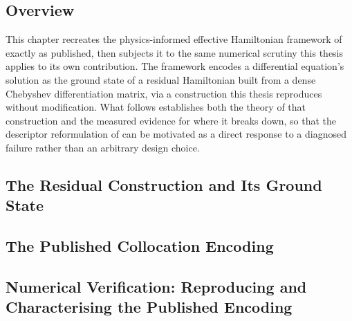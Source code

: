%

\subsection{Overview}
This chapter recreates the physics-informed effective Hamiltonian framework of \cite{wu2025pihm} exactly as published, then subjects it to the same numerical scrutiny this thesis applies to its own contribution. The framework encodes a differential equation's solution as the ground state of a residual Hamiltonian built from a dense Chebyshev differentiation matrix, via a construction this thesis reproduces without modification. What follows establishes both the theory of that construction and the measured evidence for where it breaks down, so that the descriptor reformulation of  can be motivated as a direct response to a diagnosed failure rather than an arbitrary design choice.

\subsection{The Residual Construction and Its Ground State}

\subsection{The Published Collocation Encoding}

\subsection{Numerical Verification: Reproducing and Characterising the Published Encoding}

